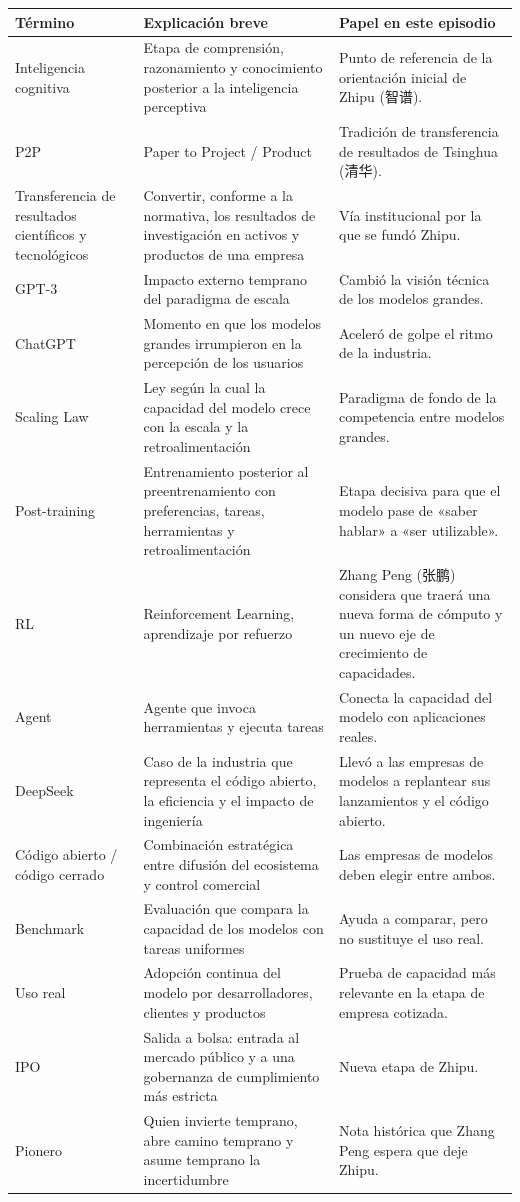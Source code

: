 \documentclass[a4paper]{article}
\begin{document}
\begin{longtable}{p{}p{}p{}}
\toprule
Término & Explicación breve & Papel en este episodio \\
\midrule
Inteligencia cognitiva & Etapa de comprensión, razonamiento y conocimiento posterior a la inteligencia perceptiva & Punto de referencia de la orientación inicial de Zhipu (智谱). \\
P2P & Paper to Project / Product & Tradición de transferencia de resultados de Tsinghua (清华). \\
Transferencia de resultados científicos y tecnológicos & Convertir, conforme a la normativa, los resultados de investigación en activos y productos de una empresa & Vía institucional por la que se fundó Zhipu. \\
GPT-3 & Impacto externo temprano del paradigma de escala & Cambió la visión técnica de los modelos grandes. \\
ChatGPT & Momento en que los modelos grandes irrumpieron en la percepción de los usuarios & Aceleró de golpe el ritmo de la industria. \\
Scaling Law & Ley según la cual la capacidad del modelo crece con la escala y la retroalimentación & Paradigma de fondo de la competencia entre modelos grandes. \\
Post-training & Entrenamiento posterior al preentrenamiento con preferencias, tareas, herramientas y retroalimentación & Etapa decisiva para que el modelo pase de «saber hablar» a «ser utilizable». \\
RL & Reinforcement Learning, aprendizaje por refuerzo & Zhang Peng (张鹏) considera que traerá una nueva forma de cómputo y un nuevo eje de crecimiento de capacidades. \\
Agent & Agente que invoca herramientas y ejecuta tareas & Conecta la capacidad del modelo con aplicaciones reales. \\
DeepSeek & Caso de la industria que representa el código abierto, la eficiencia y el impacto de ingeniería & Llevó a las empresas de modelos a replantear sus lanzamientos y el código abierto. \\
Código abierto / código cerrado & Combinación estratégica entre difusión del ecosistema y control comercial & Las empresas de modelos deben elegir entre ambos. \\
Benchmark & Evaluación que compara la capacidad de los modelos con tareas uniformes & Ayuda a comparar, pero no sustituye el uso real. \\
Uso real & Adopción continua del modelo por desarrolladores, clientes y productos & Prueba de capacidad más relevante en la etapa de empresa cotizada. \\
IPO & Salida a bolsa: entrada al mercado público y a una gobernanza de cumplimiento más estricta & Nueva etapa de Zhipu. \\
Pionero & Quien invierte temprano, abre camino temprano y asume temprano la incertidumbre & Nota histórica que Zhang Peng espera que deje Zhipu. \\
\bottomrule
\end{longtable}
\end{document}
